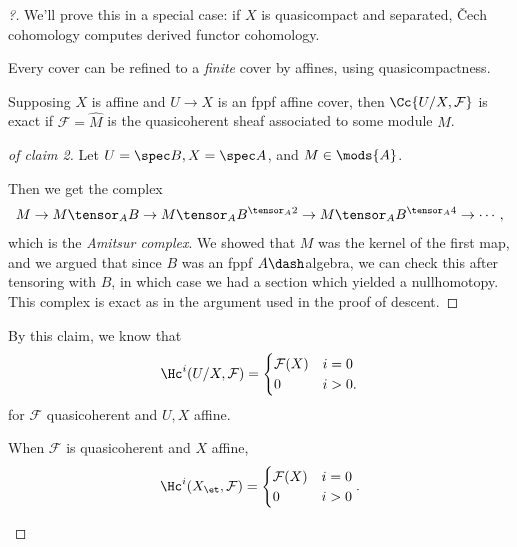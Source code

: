 \begin{proof}[?]

We'll prove this in a special case: if \(X\) is quasicompact and
separated, Čech cohomology computes derived functor cohomology.

\begin{claim}[1]

Every cover can be refined to a \emph{finite} cover by affines, using
quasicompactness.

\end{claim}

\begin{claim}[2]

Supposing \(X\) is affine and \(U\to X\) is an fppf affine cover, then
\(\Cc{U/X, \mathcal{F}}\) is exact if \(\mathcal{F} = \hat M\) is the
quasicoherent sheaf associated to some module \(M\).

\end{claim}

\begin{proof}[of claim 2]

Let \(U=\spec B, X = \spec A\), and \(M\in \mods{A}\).

Then we get the complex
\begin{align*}  
M\to
M\tensor_A B \to 
M\tensor_A B^{\tensor_A 2} \to 
M\tensor_A B^{\tensor_A 4} \to 
\cdots
,\end{align*} which is the \emph{Amitsur complex}. We showed that \(M\)
was the kernel of the first map, and we argued that since \(B\) was an
fppf \(A\dash\)algebra, we can check this after tensoring with \(B\), in
which case we had a section which yielded a nullhomotopy. This complex
is exact as in the argument used in the proof of descent.

\end{proof}

By this claim, we know that
\begin{align*}  
\Hc^{i}(U/X, \mathcal{F}) = 
\begin{cases}
\mathcal{F}(X) & i = 0 \\
0              & i>0.
\end{cases}
\end{align*} for \(\mathcal{F}\) quasicoherent and \(U, X\) affine.

\begin{claim}[3]

When \(\mathcal{F}\) is quasicoherent and \(X\) affine,
\begin{align*}  
\Hc^i(X_\et, \mathcal{F}) = 
\begin{cases}
\mathcal{F}(X) & i = 0 \\
0              & i>0
\end{cases}
.\end{align*}


\end{claim}
\end{proof}

